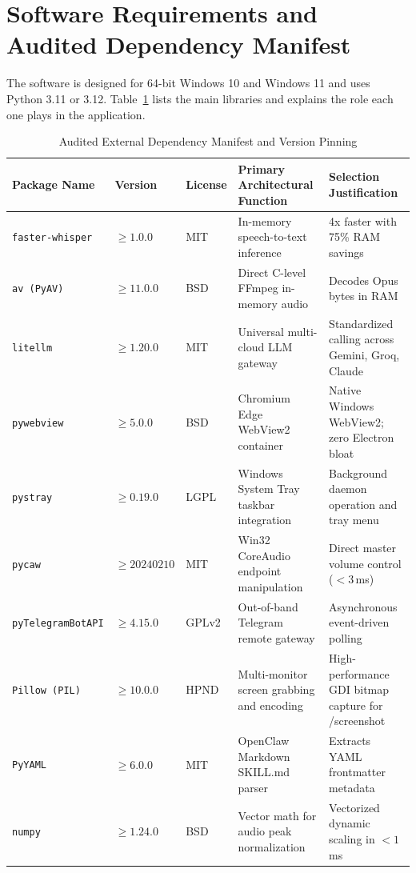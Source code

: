 \documentclass[12pt,letterpaper,oneside]{report}
\begin{document}
\section{Software Requirements and Audited Dependency Manifest}
The software is designed for 64-bit Windows 10 and Windows 11 and uses Python 3.11 or 3.12. Table~\ref{tab:dependencies} lists the main libraries and explains the role each one plays in the application.

\begin{table}[H]
\centering
\caption{Audited External Dependency Manifest and Version Pinning}
\label{tab:dependencies}
\begin{tabularx}{\textwidth}{|l|l|l|X|X|}
\hline
\textbf{Package Name} & \textbf{Version} & \textbf{License} & \textbf{Primary Architectural Function} & \textbf{Selection Justification}\\ \hline
\texttt{faster-whisper} & $\ge 1.0.0$ & MIT & In-memory speech-to-text inference & 4x faster with 75\% RAM savings\\ \hline
\texttt{av (PyAV)} & $\ge 11.0.0$ & BSD & Direct C-level FFmpeg in-memory audio & Decodes Opus bytes in RAM\\ \hline
\texttt{litellm} & $\ge 1.20.0$ & MIT & Universal multi-cloud LLM gateway & Standardized calling across Gemini, Groq, Claude\\ \hline
\texttt{pywebview} & $\ge 5.0.0$ & BSD & Chromium Edge WebView2 container & Native Windows WebView2; zero Electron bloat\\ \hline
\texttt{pystray} & $\ge 0.19.0$ & LGPL & Windows System Tray taskbar integration & Background daemon operation and tray menu\\ \hline
\texttt{pycaw} & $\ge 20240210$ & MIT & Win32 CoreAudio endpoint manipulation & Direct master volume control ($<3$\,ms)\\ \hline
\texttt{pyTelegramBotAPI} & $\ge 4.15.0$ & GPLv2 & Out-of-band Telegram remote gateway & Asynchronous event-driven polling\\ \hline
\texttt{Pillow (PIL)} & $\ge 10.0.0$ & HPND & Multi-monitor screen grabbing and encoding & High-performance GDI bitmap capture for /screenshot\\ \hline
\texttt{PyYAML} & $\ge 6.0.0$ & MIT & OpenClaw Markdown SKILL.md parser & Extracts YAML frontmatter metadata\\ \hline
\texttt{numpy} & $\ge 1.24.0$ & BSD & Vector math for audio peak normalization & Vectorized dynamic scaling in $<1$\,ms\\ \hline
\end{tabularx}
\end{table}
\end{document}
